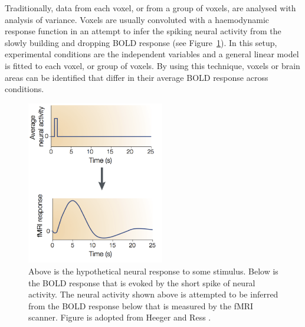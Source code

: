 \documentclass[preprint,journal,11pt]{vgtc}
\begin{document}
Traditionally, data from each voxel, or from a group of voxels, are analysed with analysis of variance. Voxels are usually convoluted with a haemodynamic response function in an attempt to infer the spiking neural activity from the slowly building and dropping BOLD response \cite{he:2002na} (see Figure~\ref{fig:bold_response}). In this setup, experimental conditions are the independent variables and a general linear model is fitted to each voxel, or group of voxels. By using this technique, voxels or brain areas can be identified that differ in their average BOLD response across conditions.\\
\begin{figure}
	\centering
	\includegraphics[width=60mm]{figures/f1_bold_response}
  	\caption{Above is the hypothetical neural response to some stimulus. Below is the BOLD response that is evoked by the short spike of neural activity. The neural activity shown above is attempted to be inferred from the BOLD response below that is measured by the fMRI scanner. Figure is adopted from Heeger and Ress \cite{he:2002na}.}
  	\label{fig:bold_response}
\end{figure}
\end{document}
